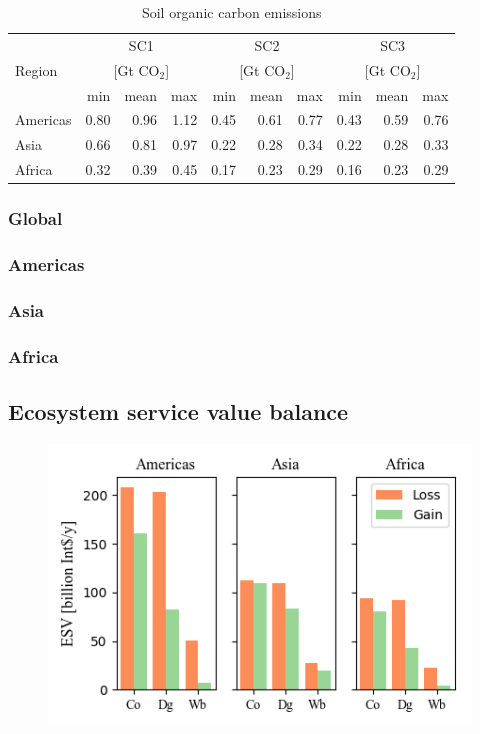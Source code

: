 		
		\begin{table}[ht]
			\centering
			\caption[Soil organic carbon emissions]{Soil organic carbon emissions}
			\label{tab:soce_tab}
			\begin{tabular}{lrrrrrrrrr}
				\hline
				\multirow{3}{*}{Region} & \multicolumn{3}{c}{SC1}& \multicolumn{3}{c}{SC2} & \multicolumn{3}{c}{SC3} \\
				& \multicolumn{3}{c}{[Gt CO$_2$]}& \multicolumn{3}{c}{[Gt CO$_2$]} & \multicolumn{3}{c}{[Gt CO$_2$]} \\
				& min & mean & max & min & mean & max & min & mean & max \\\hline
				Americas & 0.80 & 0.96 & 1.12 & 0.45 & 0.61 & 0.77 & 0.43 & 0.59 & 0.76 \\
				Asia & 0.66 & 0.81 & 0.97 & 0.22 & 0.28 & 0.34 & 0.22 & 0.28 & 0.33 \\
				Africa & 0.32 & 0.39 & 0.45 & 0.17 & 0.23 & 0.29 & 0.16 & 0.23 & 0.29 \\\hline
			\end{tabular}
		\end{table}

		\subsubsection{Global}
		\subsubsection{Americas}
		\subsubsection{Asia}
		\subsubsection{Africa}

	\subsection{Ecosystem service value balance}

		\begin{figure}[ht]
			\centering
			\includegraphics[scale=1]{img/esv}
			\caption[Ecosystem service values]{}
			\label{fig:esv}
		\end{figure}

